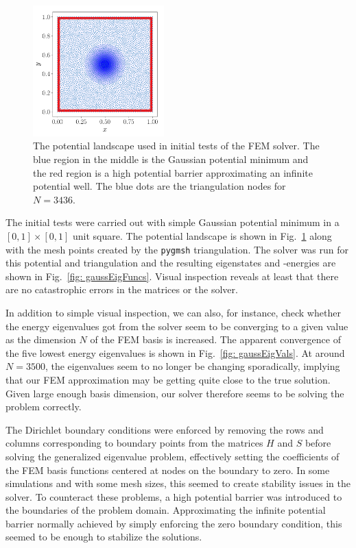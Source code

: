 \documentclass[a4paper,12pt]{article}
\begin{document}
\begin{figure}
\vspace{-20pt}
\hspace{10pt}
\begin{center}
\includegraphics[width=0.45\textwidth]{../figs/gauss_pot.pdf}
\caption{The potential landscape used in initial tests of the FEM solver. The blue region in the middle is the Gaussian potential minimum and the red region is a high potential barrier approximating an infinite potential well. The blue dots are the triangulation nodes for $N=3436$. }
\label{fig: gaussPot}
\end{center}
\end{figure}
The initial tests were carried out with simple Gaussian potential minimum in a $[0,1]\times[0,1]$ unit square. The potential landscape is shown in Fig.~\ref{fig: gaussPot} along with the mesh points created by the \texttt{pygmsh} triangulation. The solver was run for this potential and triangulation and the resulting eigenstates and -energies are shown in Fig.~\ref{fig: gaussEigFuncs}. Visual inspection reveals at least that there are no catastrophic errors in the matrices or the solver.

In addition to simple visual inspection, we can also, for instance, check whether the energy eigenvalues got from the solver seem to be converging to a given value as the dimension $N$ of the FEM basis is increased. The apparent convergence of the five lowest energy eigenvalues is shown in Fig.~\ref{fig: gaussEigVals}. At around $N=3500$, the eigenvalues seem to no longer be changing sporadically, implying that our FEM approximation may be getting quite close to the true solution. Given large enough basis dimension, our solver therefore seems to be solving the problem correctly.

The Dirichlet boundary conditions were enforced by removing the rows and columns corresponding to boundary points from the matrices $H$ and $S$ before solving the generalized eigenvalue problem, effectively setting the coefficients of the FEM basis functions centered at nodes on the boundary to zero. In some simulations and with some mesh sizes, this seemed to create stability issues in the solver. To counteract these problems, a high potential barrier was introduced to the boundaries of the problem domain. Approximating the infinite potential barrier normally achieved by simply enforcing the zero boundary condition, this seemed to be enough to stabilize the solutions. 
\end{document}
